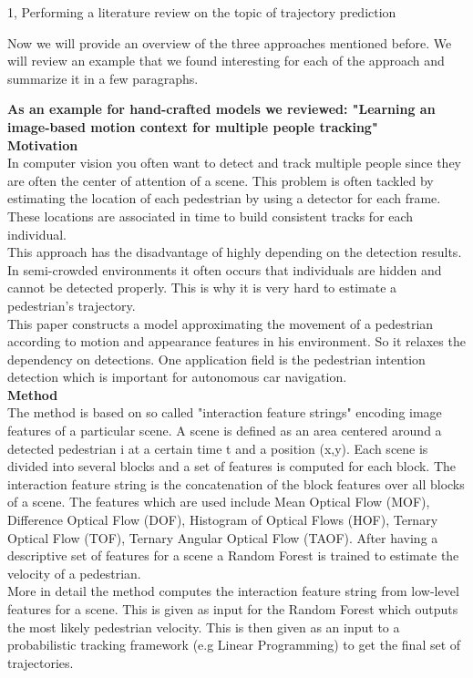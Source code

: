 \documentclass[10pt,a4paper]{article}
\begin{document}
\begin{task}{1, Performing a literature review on the topic of trajectory prediction}
    \newpage
    
    Now we will provide an overview of the three approaches mentioned before. We will review an example that we found interesting for each of the approach and summarize it in a few paragraphs. \bigbreak
    
    \textbf{As an example for hand-crafted models we reviewed: "Learning an image-based motion context for multiple people tracking" \cite{laura}} \\
    
    \textbf{Motivation}\\
    In computer vision you often want to detect and track multiple people since they are often the center of attention of a scene. This problem is often tackled by estimating the location of each pedestrian by using a detector for each frame. These locations are associated in time to build consistent tracks for each individual. \\ This approach has the disadvantage of highly depending on the detection results. In semi-crowded environments it often occurs that individuals are hidden and cannot be detected properly. This is why it is very hard to estimate a pedestrian's trajectory.\\
    This paper constructs a model approximating the movement of a pedestrian according to motion and appearance features in his environment. So it relaxes the dependency on detections. One application field is the pedestrian intention detection which is important for autonomous car navigation.\\
    \textbf{Method}\\
    The method is based on so called "interaction feature strings" encoding image features of a particular scene. A scene is defined as an area centered around a detected pedestrian i at a certain time t and a position (x,y). Each scene is divided into several blocks and a set of features is computed for each block. The interaction feature string is the concatenation of the block features over all blocks of a scene. The features which are used include Mean Optical Flow (MOF), Difference Optical Flow (DOF), Histogram of Optical Flows (HOF), Ternary Optical Flow (TOF), Ternary Angular Optical Flow (TAOF). 
    After having a descriptive set of features for a scene a  Random Forest is trained to estimate the velocity of a pedestrian. \\
    More in detail the method computes the interaction feature string from low-level features for a scene. This is given as input for the Random Forest which outputs the most likely pedestrian velocity. This is then given as an input to a probabilistic tracking framework (e.g Linear Programming) to get the final set of trajectories.\\

\end{task}
\end{document}
